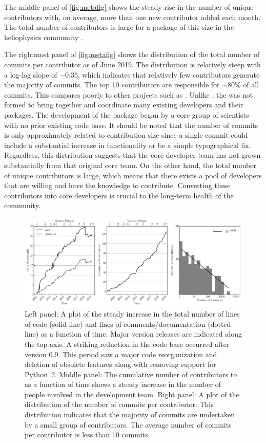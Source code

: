 The middle panel of \autoref{fig:metafig} shows the steady rise in the number of unique contributors with, on average, more than one new contributor added each month.
The total number of contributors is large for a package of this size in the heliophysics community \citep{pyhc2018}.

The rightmost panel of \autoref{fig:metafig} shows the distribution of the total number of commits per contributor as of June 2019.
The distribution is relatively steep with a log-log slope of $-0.35$, which indicates that relatively few contributors generate the majority of commits.
The top 10 contributors are responsible for ${\sim}80\%$ of all commits.
This compares poorly to other projects such as \astropy \citep{astropy2018}.
Unlike \astropy, the \sunpyproj was not formed to bring together and coordinate many existing developers and their \python packages.
The development of the \sunpypkg package began by a core group of scientists with no prior existing code base.
It should be noted that the number of commits is only approximately related to contribution size since a single commit could include a substantial increase in functionality or be a simple typographical fix.
Regardless, this distribution suggests that the core developer team has not grown substantially from that original core team.
On the other hand, the total number of unique contributors is large, which means that there exists a pool of \sunpypkg developers that are willing and have the knowledge to contribute.
Converting these contributors into core developers is crucial to the long-term health of the community.


\begin{figure}
    \center
    \includegraphics[width = 1.0\textwidth]{figures/dev_meta.pdf}
    \caption{Left panel: A plot of the steady increase in the total number of lines of code (solid line) and lines of comments/documentation (dotted line) as a function of time.
	Major version releases are indicated along the top axis.
	A striking reduction in the code base occurred after version 0.9.
	This period saw a major code reorganization and deletion of obsolete features along with removing support for Python~2.
	Middle panel: The cumulative number of contributors to \sunpypkg as a function of time shows a steady increase in the number of people involved in the development team.
	Right panel: A plot of the distribution of the number of commits per contributor.
	This distribution indicates that the majority of commits are undertaken by a small group of contributors. The average number of commits per contributor is less than 10 commits.}
\label{fig:metafig}
\end{figure}
